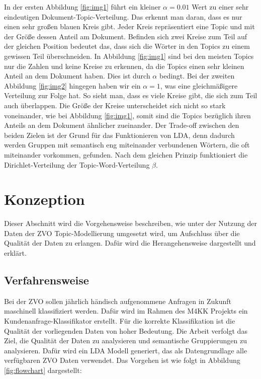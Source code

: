 \documentclass[german,version-2020-11]{uzl-thesis}
\begin{document}
In der ersten Abbildung \ref{fig:img1} führt ein kleiner $\alpha = 0.01$ Wert zu einer sehr eindeutigen Dokument-Topic-Verteilung. Das erkennt man daran, dass es nur einen sehr großen blauen Kreis gibt. Jeder Kreis repräsentiert eine Topic und mit der Größe dessen Anteil am Dokument. Befinden sich zwei Kreise zum Teil auf der gleichen Position bedeutet das, dass sich die Wörter in den Topics zu einem gewissen Teil überschneiden. In Abbildung \ref{fig:img1} sind bei den meisten Topics nur die Zahlen und keine Kreise zu erkennen, da die Topics einen sehr kleinen Anteil an dem Dokument haben. Dies ist durch $\alpha$ bedingt. Bei der zweiten Abbildung \ref{fig:img2} hingegen haben wir ein $\alpha = 1$, was eine gleichmäßigere Verteilung zur Folge hat. So sieht man, dass es viele Kreise gibt, die sich zum Teil auch überlappen. Die Größe der Kreise unterscheidet sich nicht so stark voneinander, wie bei Abbildung \ref{fig:img1}, somit sind die Topics bezüglich ihren Anteils an dem Dokument ähnlicher zueinander. Der Trade-off zwischen den beiden Zielen ist der Grund für das Funktionieren von LDA, denn dadurch werden Gruppen mit semantisch eng miteinander verbundenen Wörtern, die oft miteinander vorkommen, gefunden. Nach dem gleichen Prinzip funktioniert die Dirichlet-Verteilung der Topic-Word-Verteilung $\beta$.  


\chapter{Konzeption} %

Dieser Abschnitt wird die Vorgehensweise beschreiben, wie unter der Nutzung der Daten der ZVO Topic-Modellierung umgesetzt wird, um Aufschluss über die Qualität der Daten zu erlangen. Dafür wird die Herangehensweise dargestellt und erklärt.

\section{Verfahrensweise}
Bei der ZVO sollen jährlich händisch aufgenommene Anfragen in Zukunft maschinell klassifiziert werden. Dafür wird im Rahmen des M4KK Projekts ein Kundenanfrage-Klassifikator erstellt. Für die korrekte Klassifikation ist die Qualität der vorliegenden Daten von hoher Bedeutung. Die Arbeit verfolgt das Ziel, die Qualität der Daten zu analysieren und semantische Gruppierungen zu analysieren. Dafür wird ein LDA Modell generiert, das als Datengrundlage alle verfügbaren ZVO Daten verwendet. Das Vorgehen ist wie folgt in Abbildung \ref{fig:flowchart} dargestellt:   
\end{document}
